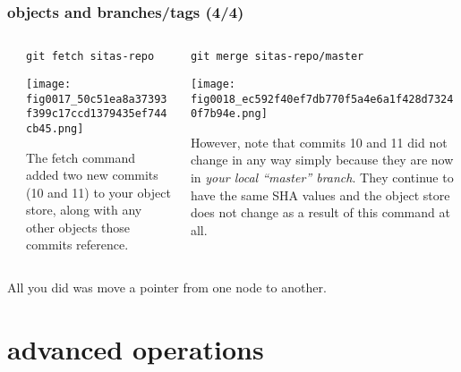 \documentclass[presentation]{beamer}
\begin{document}
\begin{frame}
\frametitle{objects and branches/tags (4/4)}
\label{sec-7-6}
\begin{columns} %
\label{sec-7-6-1}
\begin{column}{0.5\textwidth}
\label{sec-7-6-1-1}


\small

\texttt{git fetch sitas-repo}


\texttt{[image: fig0017\_50c51ea8a37393f399c17ccd1379435ef744cb45.png]}



\tiny
The fetch command added two new commits (10 and 11) to your object
store, along with any other objects those commits reference.
\end{column}
\begin{column}{0.5\textwidth}
\label{sec-7-6-1-2}


\small
\texttt{git merge sitas-repo/master}


\texttt{[image: fig0018\_ec592f40ef7db770f5a4e6a1f428d73240f7b94e.png]}




\tiny
However, note that commits 10 and 11 did not change in any way simply because
they are now in \emph{your local ``master'' branch}.  They continue to have the
same SHA values and the object store does not change as a result of this
command at all.
\end{column}
\end{columns}
\label{sec-7-6-2}


\small

All you did was move a pointer from one node to another.
\end{frame}
\section{advanced operations}
\label{sec-8}
\end{document}
